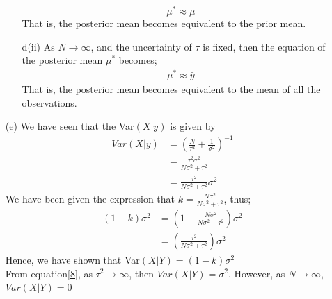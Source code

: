 \documentclass[12pt,a4paper]{article}
\begin{document}
\begin{itemize}
\begin{itemize}
	$$\mu^{*}\approx\mu$$
	That is, the posterior mean becomes equivalent to the prior mean.
	\item[d(ii)] As $N\rightarrow \infty$, and the uncertainty of $\tau$ is fixed, then the equation of the posterior mean $\mu^{*}$ becomes;
	\begin{align*}
	\mu^{*}\approx \bar{y}
	\end{align*}
	That is, the posterior mean becomes equivalent to the mean of all the observations.
\end{itemize}
\item[(e)]
We have seen that the Var$(X|y)$ is given by
\begin{align*}
Var(X|y)&=\left(\frac{N}{\tau^{2}}+\frac{1}{\sigma^{2}}\right)^{-1}\\
&=\frac{\tau^{2}\sigma^{2}}{N\sigma^{2}+\tau^{2}}\\
&=\frac{\tau^{2}}{N\sigma^{2}+\tau^{2}}\sigma^{2}
\end{align*}
We have been given the expression that $k=\frac{N\sigma^{2}}{N\sigma^{2}+\tau^{2}}$, thus;
\begin{align}
(1-k)\sigma^{2}&=\left(1-\frac{N\sigma^{2}}{N\sigma^{2}+\tau^{2}}\right)\sigma^{2}\\
&=\left(\frac{\tau^{2}}{N\sigma^{2}+\tau^{2}}\right)\sigma^{2} \label{8}
\end{align}
Hence, we have shown that Var$(X|Y)=(1-k)\sigma^{2}$\\
From equation\ref{8}, as $\tau^{2} \rightarrow \infty$, then $Var(X|Y)=\sigma^{2}$. However, as $N\rightarrow \infty$, $Var(X|Y)=0$
\end{itemize}
\end{document}
